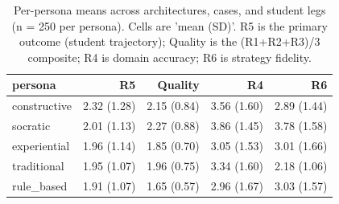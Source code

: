 \begin{table}[htbp]
\centering
\caption{Per-persona means across architectures, cases, and student legs (n = 250 per persona). Cells are 'mean (SD)'. R5 is the primary outcome (student trajectory); Quality is the (R1+R2+R3)/3 composite; R4 is domain accuracy; R6 is strategy fidelity.}
\label{tab:per-persona-means}
\begin{tabular}{lrrrr}
\toprule
persona & R5 & Quality & R4 & R6 \\
\midrule
constructive & 2.32 (1.28) & 2.15 (0.84) & 3.56 (1.60) & 2.89 (1.44) \\
socratic & 2.01 (1.13) & 2.27 (0.88) & 3.86 (1.45) & 3.78 (1.58) \\
experiential & 1.96 (1.14) & 1.85 (0.70) & 3.05 (1.53) & 3.01 (1.66) \\
traditional & 1.95 (1.07) & 1.96 (0.75) & 3.34 (1.60) & 2.18 (1.06) \\
rule\_based & 1.91 (1.07) & 1.65 (0.57) & 2.96 (1.67) & 3.03 (1.57) \\
\bottomrule
\end{tabular}
\end{table}
